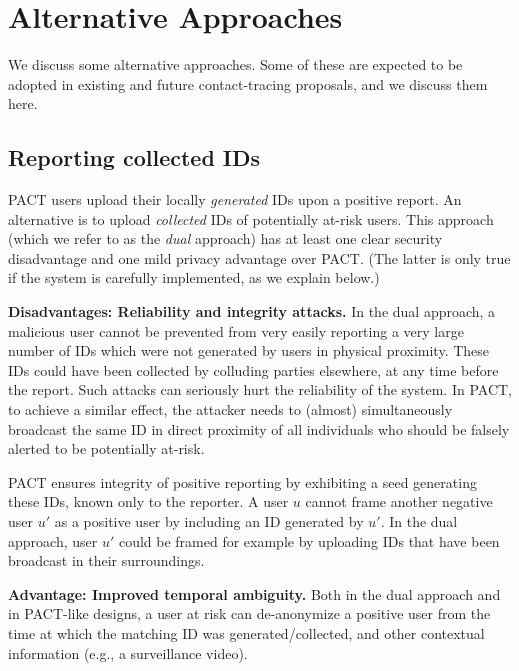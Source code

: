\documentclass{article}
\begin{document}
\section{Alternative Approaches}\label{sec:alt}

We discuss some alternative approaches. Some of these are expected to be adopted in existing and future contact-tracing proposals, and we discuss them here. 

\subsection{Reporting collected IDs}
\label{sec:dual}

PACT users upload their locally {\em generated} IDs upon a positive report. An alternative is to upload {\em collected} IDs of potentially at-risk users. This approach (which we refer to as the {\em dual} approach) has at least one clear security disadvantage and one mild privacy advantage over PACT. (The latter is only true if the system is carefully implemented, as we explain below.)

{\bf Disadvantages: Reliability and integrity attacks.} In the dual approach, a malicious user cannot be prevented from very easily reporting a very large number of IDs which were not generated by users in physical proximity. These IDs could have been collected by colluding parties elsewhere, at any time before the report. Such attacks can seriously hurt the reliability of the system. In PACT, to achieve a similar effect, the attacker needs to (almost) simultaneously broadcast the same ID in direct proximity of all individuals who should be falsely alerted to be potentially at-risk. 

PACT ensures integrity of positive reporting by exhibiting a seed generating these IDs, known only to the reporter. A user $u$ cannot frame another negative user $u'$ as a positive user by including an ID generated by $u'$. In the dual approach, user $u'$ could be framed for example by uploading IDs that have been broadcast in their surroundings.  


{\bf Advantage: Improved temporal ambiguity.} Both in the dual approach and in PACT-like designs, a user at risk can de-anonymize a positive user from the time at which the matching ID was generated/collected, and other contextual information (e.g., a surveillance video). 
\end{document}
